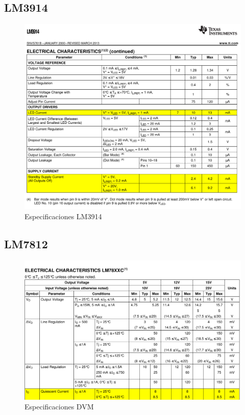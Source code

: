 \documentclass[12pt,a4paper]{article}
\begin{document}
		\subsection{LM3914}
		\begin{figure}[H]
			\centering
				\includegraphics[scale=1]{attachments/lm3914_specs.pdf}\caption{Especificaciones LM3914}
			\end{figure}

		\subsection{LM7812}
		\begin{figure}[H]
			\centering
				\includegraphics[scale=0.9]{attachments/lm7805c_specs.pdf}\caption{Especificaciones DVM}
			\end{figure}
\end{document}
